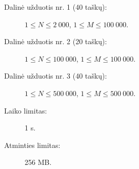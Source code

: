\documentclass{boi2014-lt}
\begin{document}
    \Scoring

    \begin{description}
        \item[Dalinė užduotis nr. 1 (40 taškų):]
            $1 \le N \le 2\ 000$, $1 \le M \le 100\ 000$.
        \item[Dalinė užduotis nr. 2 (20 taškų):]
            $1 \le N \le 100\ 000$, $1 \le M \le 100\ 000$.
        \item[Dalinė užduotis nr. 3 (40 taškų):]
            $1 \le N \le 500\ 000$, $1 \le M \le 500\ 000$.
    \end{description}

    \Constraints

    \begin{description}
        \item[Laiko limitas:] 1 s.
        \item[Atminties limitas:] 256 MB.
    \end{description}
\end{document}
